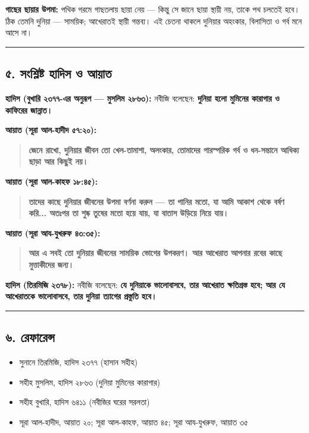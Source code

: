 \textbf{গাছের ছায়ার উপমা:} পথিক গরমে গাছতলায় ছায়া নেয় — কিন্তু সে জানে ছায়া স্থায়ী নয়, তাকে পথ চলতেই হবে। ঠিক তেমনি দুনিয়া — সাময়িক; আখেরাতই স্থায়ী গন্তব্য। এই চেতনা থাকলে দুনিয়ার অহংকার, বিলাসিতা ও গর্ব মনে আসে না।

\medskip\hrule\medskip

\subsection*{৫. সংশ্লিষ্ট হাদিস ও আয়াত}

\textbf{হাদিস (বুখারি ২৩৭৭-এর অনুরূপ — মুসলিম ২৮৬৩):} নবীজি বলেছেন: \textbf{দুনিয়া হলো মুমিনের কারাগার ও কাফিরের জান্নাত।}

\textbf{আয়াত (সূরা আল-হাদীদ ৫৭:২০):}
\begin{quote}
\textbf{জেনে রাখো, দুনিয়ার জীবন তো খেল-তামাশা, অলংকার, তোমাদের পারস্পরিক গর্ব ও ধন-সন্তানে আধিক্য ছাড়া আর কিছুই নয়।}
\end{quote}

\textbf{আয়াত (সূরা আল-কাহফ ১৮:৪৫):}
\begin{quote}
\textbf{তাদের কাছে দুনিয়ার জীবনের উপমা বর্ণনা করুন — তা পানির মতো, যা আমি আকাশ থেকে বর্ষণ করি... অতঃপর তা শুষ্ক তুষের মতো হয়ে যায়, যা বাতাস উড়িয়ে নিয়ে যায়।}
\end{quote}

\textbf{আয়াত (সূরা আয-যুখরুফ ৪৩:৩৫):}
\begin{quote}
\textbf{আর এ সবই তো দুনিয়ার জীবনের সাময়িক ভোগের উপকরণ। আর আখেরাত আপনার রবের কাছে মুত্তাকীদের জন্য।}
\end{quote}

\textbf{হাদিস (তিরমিজি ২৩৭৮):} নবীজি বলেছেন: \textbf{যে দুনিয়াকে ভালোবাসবে, তার আখেরাত ক্ষতিগ্রস্ত হবে; আর যে আখেরাতকে ভালোবাসবে, তার দুনিয়া ত্যাগের প্রস্তুতি হবে।}

\medskip\hrule\medskip

\subsection*{৬. রেফারেন্স}

\begin{itemize}
\item সুনানে তিরমিজি, হাদিস ২৩৭৭ (হাসান সহীহ)
\item সহীহ মুসলিম, হাদিস ২৮৬৩ (দুনিয়া মুমিনের কারাগার)
\item সহীহ বুখারি, হাদিস ৬৪১১ (নবীজির ঘরের সরলতা)
\item সূরা আল-হাদীদ, আয়াত ২০; সূরা আল-কাহফ, আয়াত ৪৫; সূরা আয-যুখরুফ, আয়াত ৩৫
\end{itemize}


